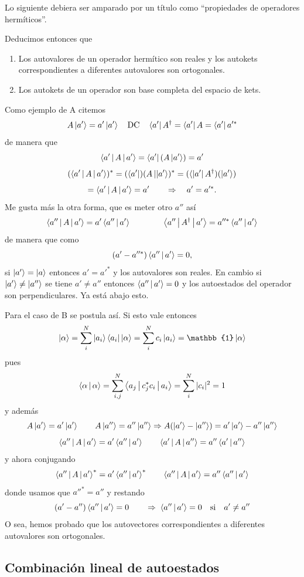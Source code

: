 \documentclass[10pt,oneside]{CBFT_book}
\begin{document}
Lo siguiente debiera ser amparado por un título como ``propiedades de operadores hermíticos''.

Deducimos entonces que
\begin{enumerate}
	\item Los autovalores de un operador hermítico son reales y los autokets correspondientes a diferentes
	autovalores son ortogonales.
	\item Los autokets de un operador son base completa del espacio de kets.
\end{enumerate}

Como ejemplo de A citemos
\[
	A\Ket{a'} = a' \Ket{a'} \quad \text{DC} \quad \Bra{a'} A^{\dagger} = \Bra{a'} A = \Bra{a'}a'^*
\]
de manera que 
\[
	\Braket{a'|A|a'} = \Bra{a'} ( A\Ket{a'} ) = a'
\]
\[
	( \Braket{a'|A|a'} )^* = ( \Bra{a'} )( A\Ket{|a'} )^* = ( \Bra{|a'}A^\dagger )( \Ket{a'} )
\]
\[
	= \Braket{a'|A|a'} = a' \qquad \Rightarrow \quad a' = a'^*.
\]
Me gusta más la otra forma, que es meter otro $a''$ así
\[
	\Braket{a''|A|a'} = a' \Braket{a''|a'} \qquad \qquad \Braket{a''|A^\dagger|a'} = a''^* \Braket{a''|a'}
\]
de manera que como
\[
	(a' - a''^*) \Braket{a''|a'} = 0,
\]
si $\Ket{a'}=\Ket{a}$ entonces $a' = a'^*$ y los autovalores son reales. En cambio si $\Ket{a'}\neq\Ket{a''}$ 
se tiene $a'\neq a''$ entonces  $\Braket{a''|a'} = 0$ y los autoestados del operador son perpendiculares.
Ya está abajo esto.

Para el caso de B se postula así. Si esto vale entonces 
\[
	\Ket{\alpha} = \sum_i^N \Ket{a_i}\Bra{a_i} \Ket{\alpha} = \sum_i^N c_i \Ket{a_i} = 
	\mathbb{1}\Ket{\alpha}
\]
pues 
\[
	\Braket{\alpha|\alpha} = \sum_{i,j}^N \Braket{ a_j|c_j^* c_i|a_i} = \sum_i^N |c_i|^2 = 1
\]
y además 
\[
	A\Ket{a'} = a'\Ket{a'} \qquad A\Ket{a''} = a''\Ket{a''} \Rightarrow 
	A(\Ket{a'} - \Ket{a''} ) = a'\Ket{a'} - a''\Ket{a''}
\]
\[
	\Braket{ a''|A|a' } = a' \Braket{ a''|a' } \qquad \Braket{ a'|A|a'' } = a'' \Braket{ a'|a'' }
\]
y ahora conjugando
\[
	\Braket{ a''|A|a' }^* = a' \Braket{ a''|a' }^* \qquad \Braket{ a''|A|a' } = a'' \Braket{ a''|a' }
\]
donde usamos que $a''^* = a''$ y restando 
\[
	(a'-a'')\Braket{a''|a'} = 0 \qquad \Rightarrow \; \Braket{a''|a'} = 0 
		\quad \text{si} \quad a'\neq a''
\]
O sea, hemos probado que los autovectores correspondientes a diferentes autovalores son
ortogonales.


\subsection{Combinación lineal de autoestados}
\end{document}

